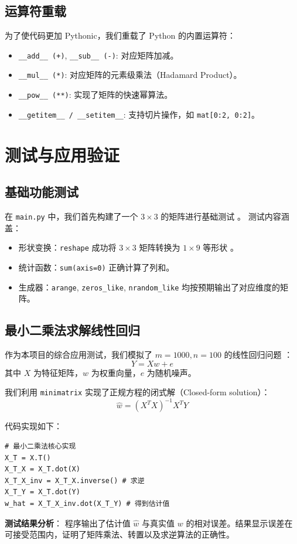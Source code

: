 \documentclass[a4paper,12pt]{ctexart}
\begin{document}
\subsection{运算符重载}
为了使代码更加 Pythonic，我们重载了 Python 的内置运算符：
\begin{itemize}
    \item \texttt{\_\_add\_\_ (+)}, \texttt{\_\_sub\_\_ (-)}: 对应矩阵加减。
    \item \texttt{\_\_mul\_\_ (*)}: 对应矩阵的元素级乘法（Hadamard Product）。
    \item \texttt{\_\_pow\_\_ (**)}: 实现了矩阵的快速幂算法。
    \item \texttt{\_\_getitem\_\_ / \_\_setitem\_\_}: 支持切片操作，如 \texttt{mat[0:2, 0:2]}。
\end{itemize}

\newpage

\section{测试与应用验证}

\subsection{基础功能测试}
在 \texttt{main.py} 中，我们首先构建了一个 $3 \times 3$ 的矩阵进行基础测试 \cite{source: 17}。
测试内容涵盖：
\begin{itemize}
    \item 形状变换：\texttt{reshape} 成功将 $3 \times 3$ 矩阵转换为 $1 \times 9$ 等形状 \cite{source: 20}。
    \item 统计函数：\texttt{sum(axis=0)} 正确计算了列和。
    \item 生成器：\texttt{arange}, \texttt{zeros\_like}, \texttt{nrandom\_like} 均按预期输出了对应维度的矩阵。
\end{itemize}

\subsection{最小二乘法求解线性回归}
作为本项目的综合应用测试，我们模拟了 $m=1000, n=100$ 的线性回归问题 \cite{source: 24}：
\[ Y = Xw + e \]
其中 $X$ 为特征矩阵，$w$ 为权重向量，$e$ 为随机噪声。

我们利用 \texttt{minimatrix} 实现了正规方程的闭式解（Closed-form solution）：
\[ \hat{w} = (X^T X)^{-1} X^T Y \]

代码实现如下：
\begin{lstlisting}
# 最小二乘法核心实现
X_T = X.T()
X_T_X = X_T.dot(X)
X_T_X_inv = X_T_X.inverse() # 求逆
X_T_Y = X_T.dot(Y)
w_hat = X_T_X_inv.dot(X_T_Y) # 得到估计值
\end{lstlisting}

\textbf{测试结果分析}：
程序输出了估计值 $\hat{w}$ 与真实值 $w$ 的相对误差。结果显示误差在可接受范围内，证明了矩阵乘法、转置以及求逆算法的正确性。
\end{document}
